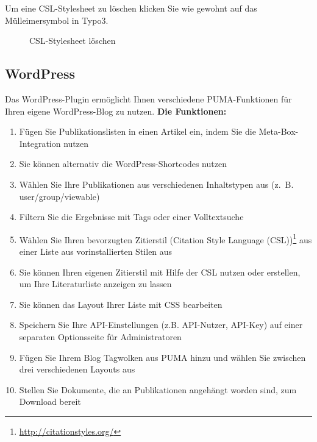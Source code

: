 Um eine CSL-Stylesheet zu löschen klicken Sie wie gewohnt auf das Mülleimersymbol in Typo3. 
\begin{figure}[h!]
 \centering
 \caption{CSL-Stylesheet löschen}
 \label{fig:cslLoeschen}
\end{figure}
\subsection{WordPress}
\label{subsec:wordpress}
Das WordPress-Plugin ermöglicht Ihnen verschiedene PUMA-Funktionen für Ihren eigene WordPress-Blog zu nutzen.\newline\newline
\textbf{Die Funktionen:}
\begin{enumerate}
   \item Fügen Sie Publikationslisten in einen Artikel ein, indem Sie die Meta-Box-Integration nutzen
    \item Sie können alternativ die WordPress-Shortcodes nutzen
    \item Wählen Sie Ihre Publikationen aus verschiedenen Inhaltstypen aus (z.~B. user/group/viewable)
    \item Filtern Sie die Ergebnisse mit Tags oder einer Volltextsuche
    \item Wählen Sie Ihren bevorzugten Zitierstil (Citation Style Language (CSL))\footnote{\url{ http://citationstyles.org/}}  aus einer Liste aus vorinstallierten Stilen aus
    \item Sie können Ihren eigenen Zitierstil mit Hilfe der CSL nutzen oder erstellen, um Ihre Literaturliste anzeigen zu lassen
    \item Sie können das Layout Ihrer Liste mit CSS bearbeiten
    \item Speichern Sie Ihre API-Einstellungen (z.B. API-Nutzer, API-Key) auf einer separaten Optionsseite für Administratoren
    \item Fügen Sie Ihrem Blog Tagwolken aus PUMA hinzu und wählen Sie zwischen drei verschiedenen Layouts aus
    \item Stellen Sie Dokumente, die an Publikationen angehängt worden sind, zum Download bereit
\end{enumerate} 
